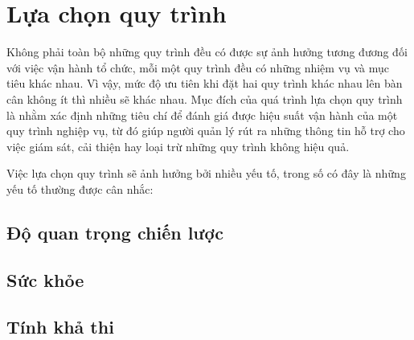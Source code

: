 \section{Lựa chọn quy trình}
Không phải toàn bộ những quy trình đều có được sự ảnh hưởng tương đương đối với việc vận hành tổ chức, mỗi một quy trình đều có những nhiệm vụ và mục tiêu khác nhau. Vì vậy, mức độ ưu tiên khi đặt hai quy trình khác nhau lên bàn cân không ít thì nhiều sẽ khác nhau. Mục đích của quá trình lựa chọn quy trình là nhằm xác định những tiêu chí để đánh giá được hiệu suất vận hành của một quy trình nghiệp vụ, từ đó giúp người quản lý rút ra những thông tin hỗ trợ cho việc giám sát, cải thiện hay loại trừ những quy trình không hiệu quả.

Việc lựa chọn quy trình sẽ ảnh hưởng bởi nhiều yếu tố, trong số có đây là những yếu tố thường được cân nhắc:

\subsection{Độ quan trọng chiến lược}
    
\subsection{Sức khỏe}
    
\subsection{Tính khả thi}
    